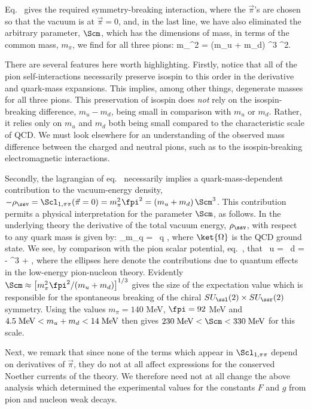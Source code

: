 \documentclass[12pt,epsf]{report}
\begin{document}
Eq.~ gives the required 
symmetry-breaking interaction, where
the $\vec\pi$'s are chosen so that the vacuum is
at $\vec \pi = 0$, and, in the last line, we have
also eliminated the arbitrary parameter, $\Scm$, which has
the dimensions of mass, in terms of the common mass,
$m_\pi$, we find for all three pions:
%
\eq
\label{pionmassprediction}
 m_\pi^2 =  (m_u + m_d) \; {\Scm^3 \over \fpi^2}.  
\eeq

There are several features here worth highlighting.
Firstly, notice that all of the pion self-interactions
necessarily preserve isospin to this order in the
derivative and quark-mass expansions. This implies, among
other things, degenerate masses for all three pions. This
preservation of isospin does {\em not} rely on the
isospin-breaking difference, $m_u - m_d$, being small in
comparison with $m_u$ or $m_d$. Rather, it relies only
on $m_u$ and $m_d$ both being small compared to the
characteristic scale of QCD. We must look elsewhere for
an understanding of the observed mass difference between
the charged and neutral pions, such as to the
isospin-breaking electromagnetic interactions.

Secondly, the lagrangian of eq.~
necessarily implies a quark-mass-dependent contribution to
the vacuum-energy density, $- \rho_\ssv
= \Scl_{1,\pi\pi}( \vec\pi =
0) = m_\pi^2 \fpi^2 = (m_u + m_d) \, \Scm^3$. This
contribution permits a physical interpretation for the
parameter $\Scm$, as follows. In the underlying theory the
derivative of the total vacuum energy, 
$\rho_\ssv$, with respect to any quark mass is given by:  
%
\eq
\label{qqbarvev}
{\partial \rho_\ssv \over \partial m_q} =
\bra{\Omega} \qbr \, q \ket{\Omega},
\eeq
%
where $\ket{\Omega}$ is the QCD ground state. We see, by
comparison with the pion scalar potential, 
eq.~, that  
%
\eq
\label{qqbarvevval}
\bra{\Omega} \ubr \, u \ket{\Omega} = 
\bra{\Omega} \dbr \, d  \ket{\Omega} =
- \Scm^3 + \cdots,
\eeq
%
where the ellipses here denote the contributions due to
quantum effects in the low-energy pion-nucleon theory.
Evidently $\Scm \approx \left[m_\pi^2 \fpi^2/(m_u+m_d)
\right]^{1/3}$ gives the size of the expectation value
which is responsible for the spontaneous breaking of the
chiral $SU_\ssl(2) \times SU_\ssr(2)$ symmetry. Using
the values $m_\pi = 140$ MeV, $\fpi = 92$ MeV and
$4.5 \; \hbox{MeV} < m_u + m_d < 14 \; \hbox{MeV}$
then gives $230 \; \hbox{MeV} < \Scm < 330 
\; \hbox{MeV}$ for this scale.

Next, we remark that since none of the terms which appear
in $\Scl_{1,\pi\pi}$ depend on derivatives of $\vec\pi$, they
do not at all affect expressions  for the
conserved Noether currents of the theory. We therefore need
not at all change the above analysis which determined the
experimental values for the constants $F$ and $g$ from pion
and nucleon weak decays.
\end{document}

